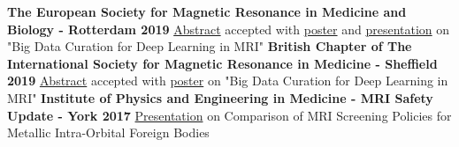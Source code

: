 %
%
%


\begin{scholarship}
					{\textbf{The European Society for Magnetic Resonance in Medicine and Biology - Rotterdam 2019} \newline
					{\color{linkcolor}\href{https://docs.google.com/document/d/1G7pH757oxIe1sHcdzDSAkMiXT1fwDc2vGO7\_s7BtnXw/edit?usp=sharing}{Abstract}}
					 accepted with {\color{linkcolor}\href{https://esmrmb2019.smart-abstract.com/eposter/\#/posters/205}{poster}}
					 and {\color{linkcolor}\href{https://docs.google.com/presentation/d/1Rxdmvw2FAuiOiUCHzFGIgZsua1LxavwbsUnkNdujhow/edit?usp=sharing}{presentation}}
					 on "Big Data Curation for Deep Learning in MRI"}
					{\textbf{British Chapter of The International Society for Magnetic Resonance in Medicine - Sheffield 2019} \newline
					{\color{linkcolor}\href{https://drive.google.com/file/d/11PLmamOCrgqiyeBzoPzvg3W4gWGqTmNs/view?usp=sharing}{Abstract}}
					 accepted with {\color{linkcolor}\href{https://drive.google.com/file/d/1F9Qs6NxkfJB5HB4zECSAqvP0\_sb515x5/view?usp=sharing}{poster}}
					 on "Big Data Curation for Deep Learning in MRI"}
					{\textbf{Institute of Physics and Engineering in Medicine - MRI Safety Update - York 2017}\newline
					 {\color{linkcolor}\href{https://drive.google.com/file/d/1zuCNWtFlhXLoXzf3aVfL0WsRmb8uQkLn/view?usp=sharing}{Presentation}}
					 on Comparison of MRI Screening Policies for Metallic Intra-Orbital Foreign Bodies}
	\emptySeparator
\end{scholarship}
